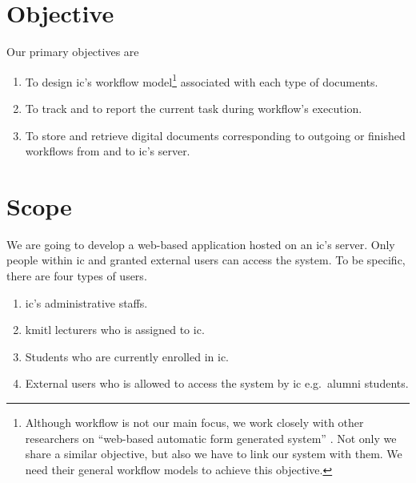 \section{Objective}
Our primary objectives are
\begin{enumerate}
\item To design \gls{ic}'s workflow model\footnote{
	Although workflow is not our main focus, we work closely with other researchers on \enquote{web-based automatic form generated system} \cite{web-based-form}.
	Not only we share a similar objective, but also we have to link our system with them.
	We need their general workflow models to achieve this objective.
} associated with each type of documents.
\item To track and to report the current task during workflow's execution.
\item To store and retrieve digital documents corresponding to outgoing or finished workflows from and to \gls{ic}'s server.
\end{enumerate}

\section{Scope}
We are going to develop a web-based application hosted on an \gls{ic}'s server.
Only people within \gls{ic} and granted external users can access the system.
To be specific, there are four types of users.
\begin{enumerate}
\item \gls{ic}'s administrative staffs.
\item \gls{kmitl} lecturers who is assigned to \gls{ic}.
\item Students who are currently enrolled in \gls{ic}.
\item External users who is allowed to access the system by \gls{ic} e.g.\ alumni students.
\end{enumerate}

